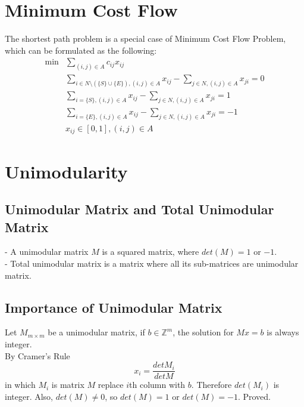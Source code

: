 		\section{Minimum Cost Flow}
			The shortest path problem is a special case of Minimum Cost Flow Problem, which can be formulated as the following:\\
			\begin{align}
				\min &\sum_{(i, j)\in A} c_{ij}x_{ij} \\
				& \sum_{i \in N\setminus(\{S\}\cup\{E\}), (i,j)\in A} x_{ij} - \sum_{j \in N, (i,j)\in A} x_{ji} = 0 \\
				& \sum_{i=\{S\}, (i,j)\in A} x_{ij} - \sum_{j \in N, (i,j)\in A} x_{ji} = 1 \\
				& \sum_{i=\{E\}, (i,j)\in A} x_{ij} - \sum_{j \in N, (i,j)\in A} x_{ji} = -1 \\
				& x_{ij} \in [0,1], (i,j)\in A 
			\end{align}

		\section{Unimodularity}
			\subsection{Unimodular Matrix and Total Unimodular Matrix}
				- A unimodular matrix $M$ is a squared matrix, where $det(M)=1$ or $-1$.\\
				- Total unimodular matrix is a matrix where all its sub-matrices are unimodular matrix.

			\subsection{Importance of Unimodular Matrix}
				Let $M_{m\times m}$ be a unimodular matrix, if $b\in \mathbb{Z}^m$, the solution for $Mx=b$ is always integer.\\
				 By Cramer's Rule
				\begin{equation}
					x_i = \frac{det{M_i}}{det{M}} 
				\end{equation}
				in which $M_i$ is matrix $M$ replace $i$th column with $b$. Therefore $det(M_i)$ is integer. Also, $det(M)\ne 0$, so $det(M)=1$ or $det(M)=-1$. Proved.

